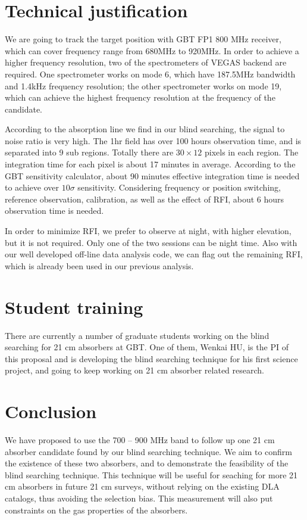 \documentclass[prl,twocolumn,floatfix,superscriptaddress,nofootinbib,aps]{revtex4}
\begin{document}
\section{Technical justification}

We are going to track the target position with GBT FP1 800 MHz receiver, which 
can cover frequency range from 680MHz to 920MHz. In order to achieve a higher
frequency resolution, two of the spectrometers of VEGAS backend are required.
One spectrometer works on mode 6, which have 187.5MHz bandwidth and 1.4kHz 
frequency resolution; the other spectrometer works on mode 19, which can 
achieve the highest frequency resolution at the frequency of the candidate. 

According to the absorption line we find in our blind searching, the signal to 
noise ratio is very high. The 1hr field has over 100 hours observation time, and is separated into 9 sub regions. Totally there are $30\times12$ pixels in each region. The integration time for
each pixel is about 17 minutes in average. According to the GBT 
sensitivity calculator, about 90 minutes effective integration time is needed 
to achieve over $10\sigma$ sensitivity. Considering frequency or position 
switching, reference observation, calibration, as well as the effect of RFI, 
about 6 hours observation time is needed.

In order to minimize RFI, we prefer to observe at night, with higher elevation, but it is not required. Only one of the two sessions can be night time.
Also with our well developed off-line data analysis code, we can flag out 
the remaining RFI, which is already been used in our previous analysis.

\section{Student training}
There are currently a number of graduate students working on the blind searching 
for 21 cm absorbers at GBT.  One of them, Wenkai HU, is the PI of this proposal and is developing 
the blind searching technique for his first science project, and going to 
keep working on 21 cm absorber related research. 

\section{Conclusion}
We have proposed to use the 700 -- 900 MHz band to follow up 
one 21 cm absorber candidate found by our blind searching technique. 
We aim to confirm the existence of these two absorbers, and to demonstrate 
the feasibility of the blind searching technique. This technique will 
be useful for seaching for more 21 cm absorbers in future
21 cm surveys, without relying on the existing DLA catalogs, 
thus avoiding the selection bias. This measurement
will also put constraints on the gas properties of the absorbers.
\end{document}
